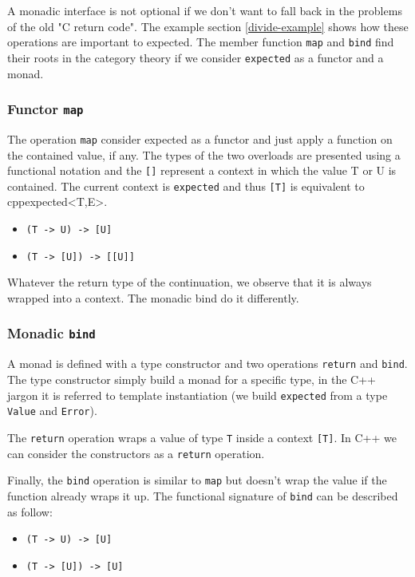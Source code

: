\documentclass[a4paper,10pt]{article}
\newcommand{\cpp}[1]{\lstinline{#1}}
\begin{document}
A monadic interface is not optional if we don't want to fall back in the problems of the old "C return code". The example section \ref{divide-example} shows how these operations are important to expected. The member function \cpp{map} and \cpp{bind} find their roots in the category theory if we consider \cpp{expected} as a functor and a monad.

\subsubsection{Functor \cpp{map}}

The operation \cpp{map} consider expected as a functor and just apply a function on the contained value, if any. The types of the two overloads are presented using a functional notation and the \cpp{[]} represent a context in which the value T or U is contained. The current context is \cpp{expected} and thus \cpp{[T]} is equivalent to \\cpp{expected<T,E>}.

\begin{itemize}
\item \cpp{(T -> U) -> [U]}
\item \cpp{(T -> [U]) -> [[U]]}
\end{itemize}

Whatever the return type of the continuation, we observe that it is always wrapped into a context. The monadic bind do it differently.

\subsubsection{Monadic \cpp{bind}}

A monad is defined with a type constructor and two operations \cpp{return} and \cpp{bind}. The type constructor simply build a monad for a specific type, in the C++ jargon it is referred to template instantiation (we build \cpp{expected} from a type \cpp{Value} and \cpp{Error}).

The \cpp{return} operation wraps a value of type \cpp{T} inside a context \cpp{[T]}. In C++ we can consider the constructors as a \cpp{return} operation.

Finally, the \cpp{bind} operation is similar to \cpp{map} but doesn't wrap the value if the function already wraps it up. The functional signature of \cpp{bind} can be described as follow:

\begin{itemize}
\item \cpp{(T -> U) -> [U]}
\item \cpp{(T -> [U]) -> [U]}
\end{itemize}
\end{document}
